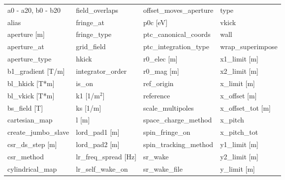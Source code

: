  \begin{tabular}{llll} \toprule
a0 - a20, b0 - b20               & field_overlaps                   & offset_moves_aperture            & type                             \\
alias                            & fringe_at                        & p0c [eV]                         & vkick                            \\
aperture [m]                     & fringe_type                      & ptc_canonical_coords             & wall                             \\
aperture_at                      & grid_field                       & ptc_integration_type             & wrap_superimpose                 \\
aperture_type                    & hkick                            & r0_elec [m]                      & x1_limit [m]                     \\
b1_gradient [T/m]                & integrator_order                 & r0_mag [m]                       & x2_limit [m]                     \\
bl_hkick [T*m]                   & is_on                            & ref_origin                       & x_limit [m]                      \\
bl_vkick [T*m]                   & k1 [1/m$^2$]                     & reference                        & x_offset [m]                     \\
bs_field [T]                     & ks [1/m]                         & scale_multipoles                 & x_offset_tot [m]                 \\
cartesian_map                    & l [m]                            & space_charge_method              & x_pitch                          \\
create_jumbo_slave               & lord_pad1 [m]                    & spin_fringe_on                   & x_pitch_tot                      \\
csr_ds_step [m]                  & lord_pad2 [m]                    & spin_tracking_method             & y1_limit [m]                     \\
csr_method                       & lr_freq_spread [Hz]              & sr_wake                          & y2_limit [m]                     \\
cylindrical_map                  & lr_self_wake_on                  & sr_wake_file                     & y_limit [m]                      \\

\end{tabular}
